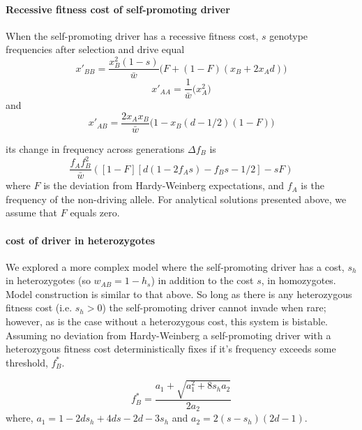 \documentclass[12pt,letterpaper]{article}
\newcommand{\yb}[1]{{ \color{blue} #1}}
\begin{document}
\yb{\paragraph{Recessive fitness cost of self-promoting driver}
When the self-promoting driver has a recessive fitness cost, $s$ genotype frequencies after selection and drive equal
\begin{equation}	x'_{BB} =\frac{x_{B}^2(1-s)}{\bar{w} }  \Big( F+(1-F)(x_{B}+2x_{A} d) \Big) 	\end{equation}
\begin{equation}	x'_{AA} =\frac{1}{\bar{w} }  \Big(x_{A}^2\Big) 	\end{equation}
and
\begin{equation}	x'_{AB} =\frac{2 x_{A}x_{B} }{\bar{w} }  \Big(1-x_{B}(d-1/2)(1-F) \Big)	\end{equation}

its change in frequency across generations $\Delta f_B$ is
\begin{equation}
\frac{f_A f_B^2}{\bar{w}} \left( [1-F][ d(1-2 f_A s) - f_B s-1/2] - s  F \right)
\label{deltadriver}
\end{equation}
where $F$ is the deviation from Hardy-Weinberg expectations, and $f_A$ is the frequency of the non-driving allele. 
For analytical solutions presented above, we assume that $F$ equals zero. 
}

\paragraph{cost of driver in heterozygotes}
We explored a more complex model where the self-promoting driver has a cost, $s_h$ in heterozygotes (so $w_{AB} = 1-h_s$) in addition to the cost $s$, in homozygotes.
Model construction is similar to that above.
So long as there is any heterozygous fitness cost (i.e. $s_h > 0$) the self-promoting driver cannot invade when rare;
	however, as is the case without a heterozygous cost, this system is bistable.
Assuming no deviation from Hardy-Weinberg a self-promoting driver with a heterozygous fitness cost deterministically fixes if it's frequency exceeds some threshold, $f_B^*$.


\begin{equation}
	f_B^* = \frac{a_1+\sqrt{a_1^2+8 s_h a_2}}{2 a_2}
	\label{thresh2}
\end{equation}
where, $a_1=1-2 ds_h+4 d s-2 d-3 s_h$ and $a_2=2(s-s_h)(2d-1)$.
 
\end{document}
